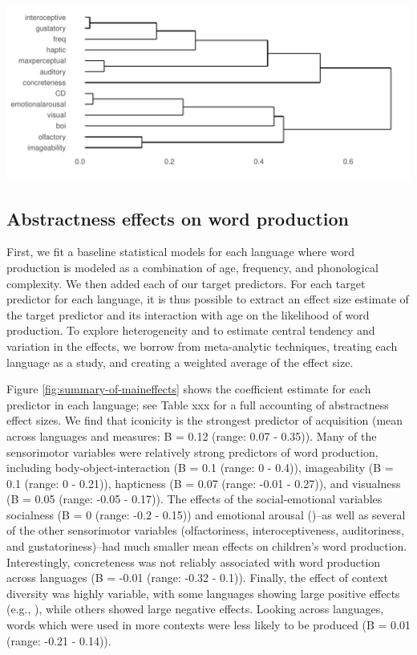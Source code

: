 \documentclass[
  man,floatsintext]{apa6}
\begin{document}
\includegraphics{crossling_abstractness_manuscript_files/figure-latex/variable-relationships-dendro-1.pdf}

\hypertarget{abstractness-effects-on-word-production}{%
\subsection{Abstractness effects on word production}\label{abstractness-effects-on-word-production}}

First, we fit a baseline statistical models for each language where word production is modeled as a combination of age, frequency, and phonological complexity. We then added each of our target predictors. For each target predictor for each language, it is thus possible to extract an effect size estimate of the target predictor and its interaction with age on the likelihood of word production. To explore heterogeneity and to estimate central tendency and variation in the effects, we borrow from meta-analytic techniques, treating each language as a study, and creating a weighted average of the effect size.

Figure \ref{fig:summary-of-maineffects} shows the coefficient estimate for each predictor in each language; see Table xxx for a full accounting of abstractness effect sizes. We find that iconicity is the strongest predictor of acquisition (mean across languages and measures: B = 0.12 (range: 0.07 - 0.35)). Many of the sensorimotor variables were relatively strong predictors of word production, including body-object-interaction (B = 0.1 (range: 0 - 0.4)), imageability (B = 0.1 (range: 0 - 0.21)), hapticness (B = 0.07 (range: -0.01 - 0.27)), and visualness (B = 0.05 (range: -0.05 - 0.17)). The effects of the social-emotional variables socialness (B = 0 (range: -0.2 - 0.15)) and emotional arousal ()--as well as several of the other sensorimotor variables (olfactoriness, interoceptiveness, auditoriness, and gustatoriness)--had much smaller mean effects on children's word production. Interestingly, concreteness was not reliably associated with word production across languages (B = -0.01 (range: -0.32 - 0.1)). Finally, the effect of context diversity was highly variable, with some languages showing large positive effects (e.g., ), while others showed large negative effects. Looking across languages, words which were used in more contexts were less likely to be produced (B = 0.01 (range: -0.21 - 0.14)).
\end{document}
